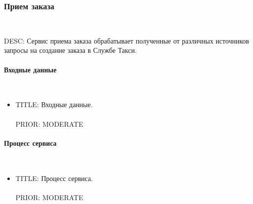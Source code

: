 \subsubsection{Прием заказа} \mbox{} \\ \label{}

    DESC: Сервис приема заказа обрабатывает полученные от различных источников запросы на создание заказа в Службе Такси. 

    \paragraph{Входные данные} \mbox{} \\ \label{}

        \begin{itemize}

          \item{

            TITLE: Входные данные.\\
            \\
            PRIOR: MODERATE\\

          }

        \end{itemize}

    \paragraph{Процесс сервиса} \mbox{} \\

        \begin{itemize}

             \item {
               TITLE: Процесс сервиса.\\
               \\
               PRIOR: MODERATE\\
             }

             \end{itemize}

